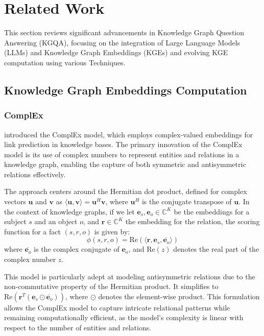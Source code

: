 \documentclass{article}
\begin{document}
\section{Related Work}
This section reviews significant advancements in Knowledge Graph Question Answering (KGQA), focusing on the integration of Large Language Models (LLMs) and Knowledge Graph Embeddings (KGEs) and evolving KGE computation using various Techniques.

\subsection{Knowledge Graph Embeddings Computation}

\subsubsection{ComplEx}
\textcite{trouillon2016complex}
 introduced the ComplEx model, which employs complex-valued embeddings for link prediction in knowledge bases. The primary innovation of the ComplEx model is its use of complex numbers to represent entities and relations in a knowledge graph, enabling the capture of both symmetric and antisymmetric relations effectively.

The approach centers around the Hermitian dot product, defined for complex vectors $\mathbf{u}$ and $\mathbf{v}$ as $\langle \mathbf{u}, \mathbf{v} \rangle = \mathbf{u}^H \mathbf{v}$, where $\mathbf{u}^H$ is the conjugate transpose of $\mathbf{u}$. In the context of knowledge graphs, if we let $\mathbf{e}_s, \mathbf{e}_o \in \mathbb{C}^K$ be the embeddings for a subject $s$ and an object $o$, and $\mathbf{r} \in \mathbb{C}^K$ the embedding for the relation, the scoring function for a fact $(s, r, o)$ is given by:
\[
\phi(s, r, o) = \text{Re}(\langle \mathbf{r}, \mathbf{e}_s, \overline{\mathbf{e}_o} \rangle)
\]
where $\overline{\mathbf{e}_o}$ is the complex conjugate of $\mathbf{e}_o$, and $\text{Re}(z)$ denotes the real part of the complex number $z$.

This model is particularly adept at modeling antisymmetric relations due to the non-commutative property of the Hermitian product. It simplifies to $\text{Re}(\mathbf{r}^T (\mathbf{e}_s \odot \overline{\mathbf{e}_o}))$, where $\odot$ denotes the element-wise product. This formulation allows the ComplEx model to capture intricate relational patterns while remaining computationally efficient, as the model's complexity is linear with respect to the number of entities and relations.
\end{document}
